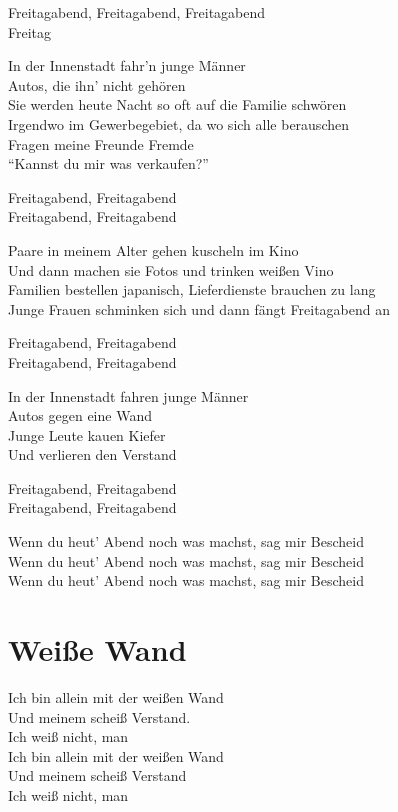\documentclass[]{book}
\begin{document}
Freitagabend, Freitagabend, Freitagabend\\
Freitag

In der Innenstadt fahr'n junge Männer\\
Autos, die ihn' nicht gehören\\
Sie werden heute Nacht so oft auf die Familie schwören\\
Irgendwo im Gewerbegebiet, da wo sich alle berauschen\\
Fragen meine Freunde Fremde\\
``Kannst du mir was verkaufen?''

Freitagabend, Freitagabend\\
Freitagabend, Freitagabend

Paare in meinem Alter gehen kuscheln im Kino\\
Und dann machen sie Fotos und trinken weißen Vino\\
Familien bestellen japanisch, Lieferdienste brauchen zu lang\\
Junge Frauen schminken sich und dann fängt Freitagabend an

Freitagabend, Freitagabend\\
Freitagabend, Freitagabend

In der Innenstadt fahren junge Männer\\
Autos gegen eine Wand\\
Junge Leute kauen Kiefer\\
Und verlieren den Verstand

Freitagabend, Freitagabend\\
Freitagabend, Freitagabend

Wenn du heut' Abend noch was machst, sag mir Bescheid\\
Wenn du heut' Abend noch was machst, sag mir Bescheid\\
Wenn du heut' Abend noch was machst, sag mir Bescheid

\hypertarget{weie-wand}{%
\section{Weiße Wand}\label{weie-wand}}

Ich bin allein mit der weißen Wand\\
Und meinem scheiß Verstand.\\
Ich weiß nicht, man\\
Ich bin allein mit der weißen Wand\\
Und meinem scheiß Verstand\\
Ich weiß nicht, man
\end{document}
